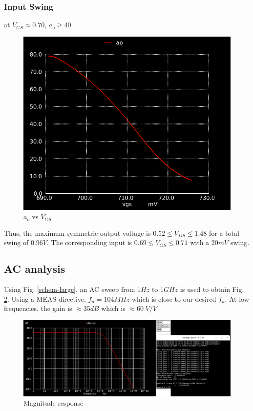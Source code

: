 \documentclass[conference]{IEEEtran}
\begin{document}
\subsubsection{Input Swing}
at $V_{GS}\approx 0.70$, $a_o \geq 40$. 
\begin{figure}[H]
	\centering 
	\includegraphics[scale=0.3]{ao-vgs.png}
	\caption{$a_o$ vs $V_{GS}$}
	\label{swing-in}
\end{figure}
Thus, the maximum symmetric output voltage is $0.52 \leq V_{DS} \leq 1.48$ for a total swing of $0.96V$. The corresponding input is $0.69 \leq V_{GS} \leq 0.71$ with a $20mV$ swing.

\subsection{AC analysis}
Using Fig. \ref{schem-large}, an AC sweep from $1 Hz$ to $1GHz$ is used to obtain Fig. \ref{vdb}. Using a MEAS directive, $f_u=104MHz$ which is close to our desired $f_u$. At low frequencies, the gain is $\approx 35dB$
which is $\approx 60\; V/V$
\begin{figure}[H]
	\centering 
	\includegraphics[width=\columnwidth]{vdb.png}
	\caption{Magnitude response}
	\label{vdb}
\end{figure}
\end{document}
